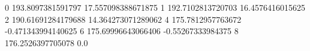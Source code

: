 0 193.8097381591797 17.557098388671875
1 192.7102813720703 16.4576416015625
2 190.61691284179688 14.364273071289062
4 175.7812957763672 -0.471343994140625
6 175.69996643066406 -0.55267333984375
8 176.2526397705078 0.0
